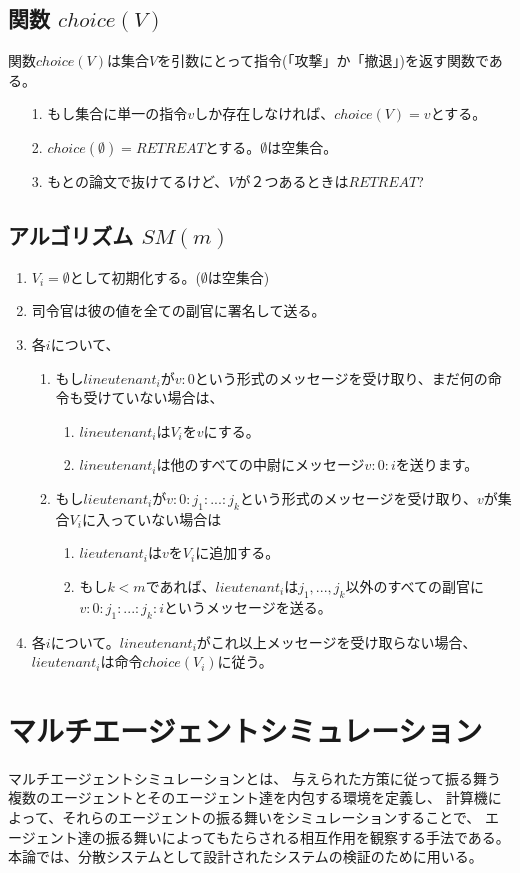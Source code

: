 \subsection{関数 $choice(V)$}
関数$choice(V)$は集合$V$を引数にとって指令(「攻撃」か「撤退」)を返す関数である。
\begin{enumerate}
  \item[1.] もし集合に単一の指令$v$しか存在しなければ、$choice(V) = v$とする。
  \item[2.] $choice(\emptyset) = RETREAT$とする。$\emptyset$は空集合。
  \item[3.] もとの論文で抜けてるけど、$V$が２つあるときは$RETREAT$?
\end{enumerate}

\subsection{アルゴリズム $SM(m)$}
\begin{enumerate}
  \item $V_i=\emptyset$として初期化する。($\emptyset$は空集合)
  \item 司令官は彼の値を全ての副官に署名して送る。
  \item 各$i$について、 
  \begin{enumerate}
    \item もし$lineutenant_i$が$v:0$という形式のメッセージを受け取り、まだ何の命令も受けていない場合は、
    \begin{enumerate}
      \item $lineutenant_i$は$ V_i$を${v}$にする。 
      \item $lineutenant_i$は他のすべての中尉にメッセージ$v:0:i$を送ります。
    \end{enumerate}
    \item もし$lieutenant_i$が$v:0:j_1:...:j_k$という形式のメッセージを受け取り、$v$が集合$V_i$に入っていない場合は
    \begin{enumerate}
      \item $lieutenant_i$は$v$を$V_i$に追加する。
      \item もし$k<m$であれば、$lieutenant_i$は$j_1, ..., j_k$以外のすべての副官に$v:0:j_1:...:j_k:i$というメッセージを送る。
    \end{enumerate}
  \end{enumerate}
  \item 各$i$について。$lineutenant_i$がこれ以上メッセージを受け取らない場合、$lieutenant_i$は命令$choice(V_i)$に従う。
\end{enumerate}

\section{マルチエージェントシミュレーション}
マルチエージェントシミュレーションとは、
与えられた方策に従って振る舞う複数のエージェントとそのエージェント達を内包する環境を定義し、
計算機によって、それらのエージェントの振る舞いをシミュレーションすることで、
エージェント達の振る舞いによってもたらされる相互作用を観察する手法である。
本論では、分散システムとして設計されたシステムの検証のために用いる。

